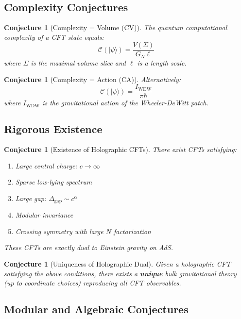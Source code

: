 \documentclass[12pt,a4paper]{article}
\newtheorem{conjecture}[theorem]{Conjecture}
\begin{document}
\subsection{Complexity Conjectures}

\begin{conjecture}[Complexity = Volume (CV)]
The quantum computational complexity of a CFT state equals:
\begin{equation}
\mathcal{C}(|\psi\rangle) = \frac{V(\Sigma)}{G_N \ell}
\end{equation}
where $\Sigma$ is the maximal volume slice and $\ell$ is a length scale.
\end{conjecture}

\begin{conjecture}[Complexity = Action (CA)]
Alternatively:
\begin{equation}
\mathcal{C}(|\psi\rangle) = \frac{I_{\text{WDW}}}{\pi \hbar}
\end{equation}
where $I_{\text{WDW}}$ is the gravitational action of the Wheeler-DeWitt patch.
\end{conjecture}

\subsection{Rigorous Existence}

\begin{conjecture}[Existence of Holographic CFTs]
There exist CFTs satisfying:
\begin{enumerate}
    \item Large central charge: $c \to \infty$
    \item Sparse low-lying spectrum
    \item Large gap: $\Delta_{\text{gap}} \sim c^\alpha$
    \item Modular invariance
    \item Crossing symmetry with large $N$ factorization
\end{enumerate}
These CFTs are exactly dual to Einstein gravity on AdS.
\end{conjecture}

\begin{conjecture}[Uniqueness of Holographic Dual]
Given a holographic CFT satisfying the above conditions, there exists a \textbf{unique} bulk gravitational theory (up to coordinate choices) reproducing all CFT observables.
\end{conjecture}

\subsection{Modular and Algebraic Conjectures}
\end{document}
